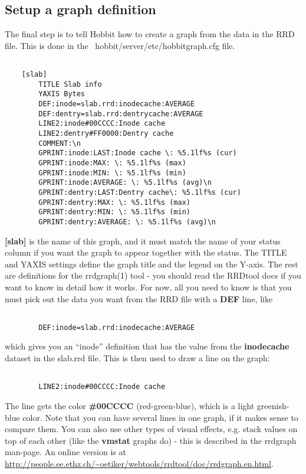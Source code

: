 \subsection{Setup a graph definition}


 The final step is to tell Hobbit how to create a graph from the data in the RRD file. This is done in the ~hobbit/server/etc/hobbitgraph.cfg file. \begin{verbatim}

	[slab]
		TITLE Slab info
		YAXIS Bytes
		DEF:inode=slab.rrd:inodecache:AVERAGE
		DEF:dentry=slab.rrd:dentrycache:AVERAGE
		LINE2:inode#00CCCC:Inode cache
		LINE2:dentry#FF0000:Dentry cache
		COMMENT:\n
		GPRINT:inode:LAST:Inode cache \: %5.1lf%s (cur)
		GPRINT:inode:MAX: \: %5.1lf%s (max)
		GPRINT:inode:MIN: \: %5.1lf%s (min)
		GPRINT:inode:AVERAGE: \: %5.1lf%s (avg)\n
		GPRINT:dentry:LAST:Dentry cache\: %5.1lf%s (cur)
		GPRINT:dentry:MAX: \: %5.1lf%s (max)
		GPRINT:dentry:MIN: \: %5.1lf%s (min)
		GPRINT:dentry:AVERAGE: \: %5.1lf%s (avg)\n

\end{verbatim}



 \textbf{[slab]}
 is the name of this graph, and it must match the name of your status column if you want the graph to appear together with the status. The TITLE and YAXIS settings define the graph title and the legend on the Y-axis. The rest are definitions for the rrdgraph(1) tool - you should read the RRDtool docs if you want to know in detail how it works. For now, all you need to know is that you must pick out the data you want from the RRD file with a \textbf{DEF}
 line, like \begin{verbatim}

		DEF:inode=slab.rrd:inodecache:AVERAGE

\end{verbatim}
 which gives you an ``inode'' definition that has the value from the \textbf{inodecache}
 dataset in the slab.rrd file. This is then used to draw a line on the graph: \begin{verbatim}

		LINE2:inode#00CCCC:Inode cache

\end{verbatim}
 The line gets the color \textbf{\#00CCCC}
 (red-green-blue), which is a light greenish-blue color. Note that you can have several lines in one graph, if it makes sense to compare them. You can also use other types of visual effects, e.g. stack values on top of each other (like the \textbf{vmstat}
 graphs do) - this is described in the rrdgraph man-page. An online version is at  \url{http://people.ee.ethz.ch/~oetiker/webtools/rrdtool/doc/rrdgraph.en.html}.


